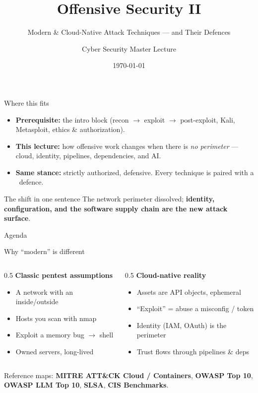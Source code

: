 \documentclass[aspectratio=169,11pt]{beamer}
\title{Offensive Security II}
\subtitle{Modern \& Cloud-Native Attack Techniques --- and Their Defences}
\author{Cyber Security Master Lecture}
\institute{HWR Berlin --- M.Sc.\ Business \& Information Systems}
\date{\today}
\begin{document}
\begin{frame}[plain]\titlepage\end{frame}

\begin{frame}{Where this fits}
  \begin{itemize}
    \item \textbf{Prerequisite:} the intro block (recon $\to$ exploit $\to$
          post-exploit, Kali, Metasploit, ethics \& authorization).
    \item \textbf{This lecture:} how offensive work changes when there is
          \emph{no perimeter} --- cloud, identity, pipelines, dependencies, and
          AI.
    \item \textbf{Same stance:} strictly authorized, defensive. Every technique
          is paired with a \textcolor{okGreen}{\faLock\ defence}.
  \end{itemize}
  \begin{alertblock}{The shift in one sentence}
    The network perimeter dissolved; \textbf{identity, configuration, and the
    software supply chain are the new attack surface}.
  \end{alertblock}
\end{frame}

\begin{frame}{Agenda}\tableofcontents\end{frame}

\begin{frame}{Why ``modern'' is different}
  \begin{columns}[T]
    \begin{column}{0.5\textwidth}
      \textbf{Classic pentest assumptions}
      \begin{itemize}\footnotesize
        \item A network with an inside/outside
        \item Hosts you scan with nmap
        \item Exploit a memory bug $\to$ shell
        \item Owned servers, long-lived
      \end{itemize}
    \end{column}
    \begin{column}{0.5\textwidth}
      \textbf{Cloud-native reality}
      \begin{itemize}\footnotesize
        \item Assets are API objects, ephemeral
        \item ``Exploit'' = abuse a misconfig / token
        \item Identity (IAM, OAuth) is the perimeter
        \item Trust flows through pipelines \& deps
      \end{itemize}
    \end{column}
  \end{columns}
  \vspace{0.5em}
  \footnotesize Reference maps: \textbf{MITRE ATT\&CK Cloud / Containers},
  \textbf{OWASP Top 10}, \textbf{OWASP LLM Top 10}, \textbf{SLSA},
  \textbf{CIS Benchmarks}.
\end{frame}
\end{document}
